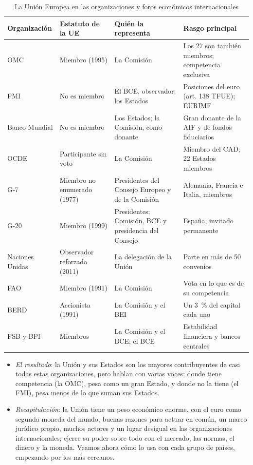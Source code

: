 \documentclass[11pt]{article}
\begin{document}
\begin{table}[H]
\centering
\caption{La Unión Europea en las organizaciones y foros económicos internacionales}\label{tab:organizaciones}
\small
\begin{tabular}{>{\raggedright\arraybackslash}m{2.6cm}>{\raggedright\arraybackslash}m{2.9cm}>{\raggedright\arraybackslash}m{3.6cm}>{\raggedright\arraybackslash}m{4.6cm}}
\toprule
\rowcolor{tceeazulpalido} Organización & Estatuto de la UE & Quién la representa & Rasgo principal \\
\midrule
OMC & Miembro (1995) & La Comisión & Los 27 son también miembros; competencia exclusiva \\
FMI & No es miembro & El BCE, observador; los Estados & Posiciones del euro (art. 138 TFUE); EURIMF \\
Banco Mundial & No es miembro & Los Estados; la Comisión, como donante & Gran donante de la AIF y de fondos fiduciarios \\
OCDE & Participante sin voto & La Comisión & Miembro del CAD; 22 Estados miembros \\
G-7 & Miembro no enumerado (1977) & Presidentes del Consejo Europeo y de la Comisión & Alemania, Francia e Italia, miembros \\
G-20 & Miembro (1999) & Presidentes; Comisión, BCE y presidencia del Consejo & España, invitado permanente \\
Naciones Unidas & Observador reforzado (2011) & La delegación de la Unión & Parte en más de 50 convenios \\
FAO & Miembro (1991) & La Comisión & Vota en lo que es de su competencia \\
BERD & Accionista (1991) & La Comisión y el BEI & Un 3~\% del capital cada uno \\
FSB y BPI & Miembros & La Comisión y el BCE; el BCE & Estabilidad financiera y bancos centrales \\
\bottomrule
\end{tabular}
\end{table}

\begin{itemize}
\item \emph{El resultado}: la Unión y sus Estados son los mayores contribuyentes de casi todas estas organizaciones, pero hablan con varias voces; donde tiene competencia (la OMC), pesa como un gran Estado, y donde no la tiene (el FMI), pesa menos de lo que suman sus Estados.
\item \emph{Recapitulación}: la Unión tiene un peso económico enorme, con el euro como segunda moneda del mundo, buenas razones para actuar en común, un marco jurídico propio, muchos actores y un lugar desigual en las organizaciones internacionales; ejerce su poder sobre todo con el mercado, las normas, el dinero y la moneda. Veamos ahora cómo lo usa con cada grupo de países, empezando por los más cercanos.
\end{itemize}
\end{document}
